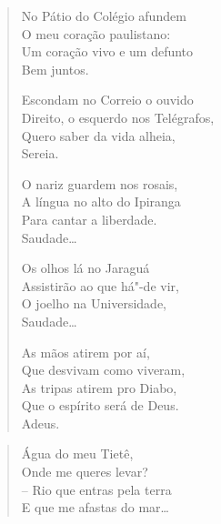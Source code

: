 {\begin{verse}
No Pátio do Colégio afundem\\
O meu coração paulistano:\\
Um coração vivo e um defunto\\
\qquad\qquad Bem juntos.

Escondam no Correio o ouvido\\
Direito, o esquerdo nos Telégrafos,\\
Quero saber da vida alheia,\\
\qquad\qquad Sereia.

O nariz guardem nos rosais,\\
A língua no alto do Ipiranga\\
Para cantar a liberdade.\\
\qquad\qquad Saudade\ldots{}

Os olhos lá no Jaraguá\\
Assistirão ao que há"-de vir,\\
O joelho na Universidade,\\
\qquad\qquad Saudade\ldots{}

As mãos atirem por aí,\\
Que desvivam como viveram,\\
As tripas atirem pro Diabo,\\
Que o espírito será de Deus.\\
\qquad\qquad Adeus.
\end{verse}



\begin{verse}
\qquad\qquad\qquad\qquad\qquad Água do meu Tietê,\\
\qquad\qquad\qquad\qquad\qquad Onde me queres levar?\\
\qquad\qquad\qquad\qquad\qquad -- Rio que entras pela terra\\
\qquad\qquad\qquad\qquad\qquad E que me afastas do mar\ldots{}
\end{verse}

}

